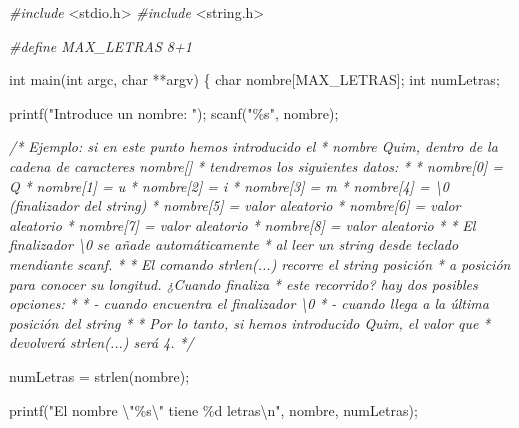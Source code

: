 \documentclass[
]{book}
\newenvironment{Shaded}{\begin{snugshade}}{\end{snugshade}}
\newcommand{\CommentTok}[1]{\textcolor[rgb]{0.56,0.35,0.01}{\textit{#1}}}
\newcommand{\DataTypeTok}[1]{\textcolor[rgb]{0.13,0.29,0.53}{#1}}
\newcommand{\ImportTok}[1]{#1}
\newcommand{\NormalTok}[1]{#1}
\newcommand{\PreprocessorTok}[1]{\textcolor[rgb]{0.56,0.35,0.01}{\textit{#1}}}
\newcommand{\SpecialCharTok}[1]{\textcolor[rgb]{0.00,0.00,0.00}{#1}}
\newcommand{\StringTok}[1]{\textcolor[rgb]{0.31,0.60,0.02}{#1}}
\begin{document}
\begin{Shaded}
\begin{Highlighting}[]
\PreprocessorTok{\#include }\ImportTok{\textless{}stdio.h\textgreater{}}
\PreprocessorTok{\#include }\ImportTok{\textless{}string.h\textgreater{}}

\PreprocessorTok{\#define MAX\_LETRAS 8+1}

\DataTypeTok{int}\NormalTok{ main(}\DataTypeTok{int}\NormalTok{ argc, }\DataTypeTok{char}\NormalTok{ **argv) \{}
    \DataTypeTok{char}\NormalTok{ nombre[MAX\_LETRAS];}
    \DataTypeTok{int}\NormalTok{ numLetras;}

\NormalTok{    printf(}\StringTok{"Introduce un nombre: "}\NormalTok{);}
\NormalTok{    scanf(}\StringTok{"\%s"}\NormalTok{, nombre);}

    \CommentTok{/* Ejemplo: si en este punto hemos introducido el}
\CommentTok{     * nombre Quim, dentro de la cadena de caracteres nombre[]}
\CommentTok{     * tendremos los siguientes datos:}
\CommentTok{     *}
\CommentTok{     * nombre[0] = \textquotesingle{}Q\textquotesingle{}}
\CommentTok{     * nombre[1] = \textquotesingle{}u\textquotesingle{}}
\CommentTok{     * nombre[2] = \textquotesingle{}i\textquotesingle{}}
\CommentTok{     * nombre[3] = \textquotesingle{}m\textquotesingle{}}
\CommentTok{     * nombre[4] = \textquotesingle{}\textbackslash{}0\textquotesingle{} (finalizador del string)}
\CommentTok{     * nombre[5] = valor aleatorio}
\CommentTok{     * nombre[6] = valor aleatorio}
\CommentTok{     * nombre[7] = valor aleatorio}
\CommentTok{     * nombre[8] = valor aleatorio}
\CommentTok{     *}
\CommentTok{     * El finalizador \textquotesingle{}\textbackslash{}0\textquotesingle{} se añade automáticamente}
\CommentTok{     * al leer un string desde teclado mendiante scanf.}
\CommentTok{     * }
\CommentTok{     * El comando strlen(...) recorre el string posición}
\CommentTok{     * a posición para conocer su longitud. ¿Cuando finaliza}
\CommentTok{     * este recorrido? hay dos posibles opciones:}
\CommentTok{     *}
\CommentTok{     * {-} cuando encuentra el finalizador \textquotesingle{}\textbackslash{}0\textquotesingle{}}
\CommentTok{     * {-} cuando llega a la última posición del string}
\CommentTok{     *}
\CommentTok{     * Por lo tanto, si hemos introducido Quim, el valor que }
\CommentTok{     * devolverá strlen(...) será 4.}
\CommentTok{     */}

\NormalTok{    numLetras = strlen(nombre);}

\NormalTok{    printf(}\StringTok{"El nombre }\SpecialCharTok{\textbackslash{}"}\StringTok{\%s}\SpecialCharTok{\textbackslash{}"}\StringTok{ tiene \%d letras}\SpecialCharTok{\textbackslash{}n}\StringTok{"}\NormalTok{, nombre, numLetras);}


\end{Highlighting}
\end{Shaded}
\end{document}
